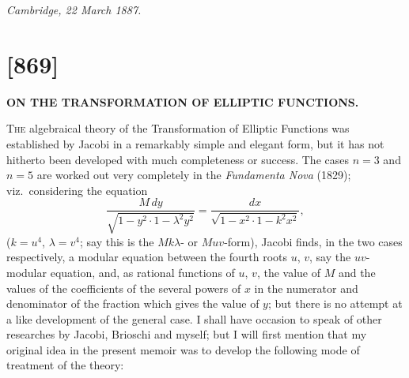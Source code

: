 \documentclass[12pt,a4paper]{article}
\theoremstyle{definition}
\begin{document}
\begin{flushright}
\textit{Cambridge, 22 March 1887.}
\end{flushright}

\newpage
\section*{[869]}
\begin{center}
\large\textbf{ON THE TRANSFORMATION OF ELLIPTIC FUNCTIONS.}
\end{center}

\begin{flushright}
\end{flushright}

\textsc{The} algebraical theory of the Transformation of Elliptic Functions was established
by Jacobi in a remarkably simple and elegant form, but it has not hitherto been
developed with much completeness or success. The cases $n = 3$ and $n = 5$ are worked
out very completely in the \textit{Fundamenta Nova} (1829); viz.\ considering the equation
\[
\frac{M\, dy}{\sqrt{1 - y^2 \cdot 1 - \lambda^2 y^2}} = \frac{dx}{\sqrt{1 - x^2 \cdot 1 - k^2 x^2}},
\]
($k = u^4$, $\lambda = v^4$; say this is the $Mk\lambda$- or $Muv$-form), Jacobi finds, in the two cases
respectively, a modular equation between the fourth roots $u$, $v$, say the $uv$-modular
equation, and, as rational functions of $u$, $v$, the value of $M$ and the values of the
coefficients of the several powers of $x$ in the numerator and denominator of the
fraction which gives the value of $y$; but there is no attempt at a like development
of the general case. I shall have occasion to speak of other researches by Jacobi,
Brioschi and myself; but I will first mention that my original idea in the present
memoir was to develop the following mode of treatment of the theory:
\end{document}
